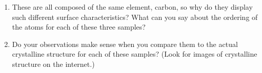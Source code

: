 \documentclass{../lab}
\begin{document}
\begin{enumerate}
     \item These are all composed of the same element, carbon, so why do they display such different surface characteristics? What can you say about the ordering of the atoms for each of these three samples?

     \item Do your observations make sense when you compare them to the actual crystalline structure for each of these samples? (Look for images of crystalline structure on the internet.)


 \end{enumerate}










\end{document}
